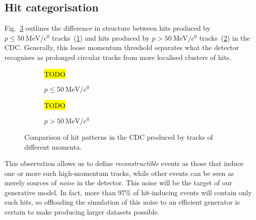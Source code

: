 
\subsection{Hit categorisation}
Fig.~\ref{fig:cdc_rconst_vs_noise} outlines the difference in structure between hits produced by $p\leq\SI{50}{\MeV/\clight}$ tracks~(\ref{fig:cdc_rconst_vs_noise:low}) and hits produced by $p>\SI{50}{\MeV/\clight}$ tracks~(\ref{fig:cdc_rconst_vs_noise:high}) in the CDC. Generally, this loose momentum threshold separates what the detector recognises as prolonged circular tracks from more localised clusters of hits.

\begin{figure}
    \centering
    \begin{subfigure}{0.4\textwidth}
        \centering
        \hl{TODO}
        \caption{$p\leq\SI{50}{\MeV/\clight}$}
        \label{fig:cdc_rconst_vs_noise:low}
    \end{subfigure}
    \hfill
    \begin{subfigure}{0.4\textwidth}
        \centering
        \hl{TODO}
        \caption{$p > \SI{50}{\MeV/\clight}$}
        \label{fig:cdc_rconst_vs_noise:high}
    \end{subfigure}
    \caption{Comparison of hit patterns in the CDC produced by tracks of different momenta.}
    \label{fig:cdc_rconst_vs_noise}
\end{figure}

This observation allows us to define \emph{reconstructible} events as those that induce one or more such high-momentum tracks, while other events can be seen as merely sources of \emph{noise} in the detector. This noise will be the target of our generative model. In fact, more than 97\% of hit-inducing events will contain only such hits, so offloading the simulation of this noise to an efficient generator is certain to make producing larger datasets possible.

